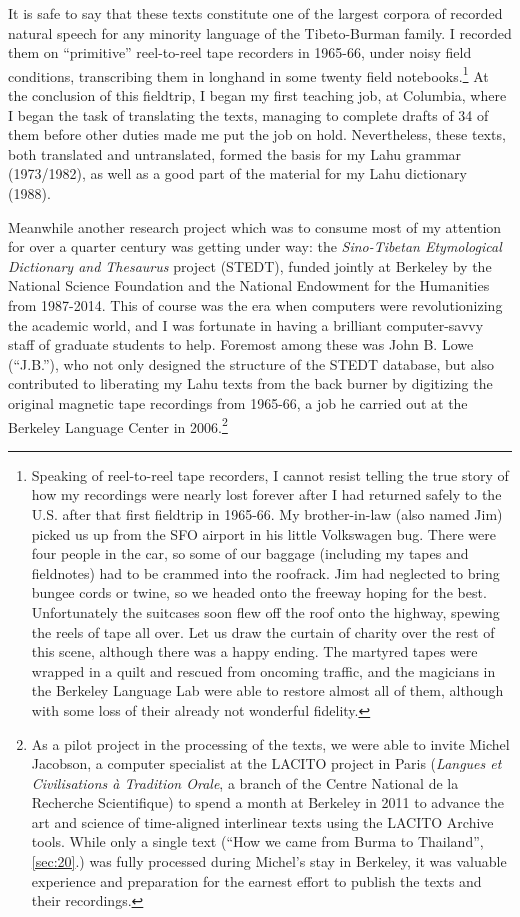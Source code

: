 It is safe to say that these texts constitute one of the largest corpora
of recorded natural speech for any minority language of the
Tibeto-Burman family. I recorded them on ``primitive'' reel-to-reel tape
recorders in 1965-66, under noisy field conditions, transcribing them in
longhand in some twenty field notebooks.\footnote{Speaking of
  reel-to-reel tape recorders, I cannot resist telling the true story of
  how my recordings were nearly lost forever after I had returned safely
  to the U.S. after that first fieldtrip in 1965-66. My brother-in-law
  (also named Jim) picked us up from the SFO airport in his little
  Volkswagen bug. There were four people in the car, so some of our
  baggage (including my tapes and fieldnotes) had to be crammed into the
  roofrack. Jim had neglected to bring bungee cords or twine, so we
  headed onto the freeway hoping for the best. Unfortunately the
  suitcases soon flew off the roof onto the highway, spewing the reels
  of tape all over. Let us draw the curtain of charity over the rest of
  this scene, although there was a happy ending. The martyred tapes were
  wrapped in a quilt and rescued from oncoming traffic, and the
  magicians in the Berkeley Language Lab were able to restore almost all
  of them, although with some loss of their already not wonderful
  fidelity.} At the conclusion of this fieldtrip, I began my first
teaching job, at Columbia, where I began the task of translating the
texts, managing to complete drafts of 34 of them before other duties
made me put the job on hold. Nevertheless, these texts, both translated
and untranslated, formed the basis for my Lahu grammar (1973/1982), as
well as a good part of the material for my Lahu dictionary (1988).

Meanwhile another research project which was to consume most of my
attention for over a quarter century was getting under way: the
\emph{Sino-Tibetan Etymological Dictionary and Thesaurus} project
(STEDT), funded jointly at Berkeley by the National Science Foundation
and the National Endowment for the Humanities from 1987-2014. This of
course was the era when computers were revolutionizing the academic
world, and I was fortunate in having a brilliant computer-savvy staff
of graduate students to help. Foremost among these was John B. Lowe
(``J.B.''), who not only designed the structure of the STEDT database,
but also contributed to liberating my Lahu texts from the back burner
by digitizing the original magnetic tape recordings from 1965-66, a
job he carried out at the Berkeley Language Center in
2006.\footnote{As a pilot project in the processing of the texts, we
  were able to invite Michel Jacobson, a computer specialist at the
  LACITO project in Paris (\emph{Langues et Civilisations à Tradition
    Orale}, a branch of the Centre National de la Recherche
  Scientifique) to spend a month at Berkeley in 2011
  to advance the art and science of time-aligned interlinear texts using the LACITO Archive
  tools. While only a single text (``How we came from
  Burma to Thailand'', \ref{sec:20}.) was fully processed during Michel's
  stay in Berkeley, it was valuable experience and preparation for the earnest
  effort to publish the texts and their recordings.}

